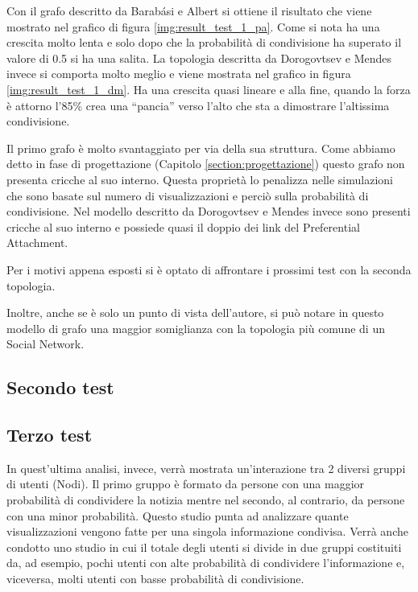 Con il grafo descritto da Barabási e Albert si ottiene il risultato che viene mostrato nel grafico di figura \ref{img:result_test_1_pa}.
Come si nota ha una crescita molto lenta e solo dopo che la probabilità di condivisione ha superato il valore di 0.5 si ha una salita.
La topologia descritta da Dorogovtsev e Mendes invece si comporta molto meglio e viene mostrata nel grafico in figura \ref{img:result_test_1_dm}.
Ha una crescita quasi lineare e alla fine, quando la forza è attorno l'85\% crea una ``pancia'' verso l'alto che sta a dimostrare l'altissima 
condivisione.

Il primo grafo è molto svantaggiato per via della sua struttura. Come abbiamo detto in fase di progettazione (Capitolo \ref{section:progettazione}) 
questo grafo non presenta cricche al suo interno.
Questa proprietà lo penalizza nelle simulazioni che sono basate sul numero di visualizzazioni e perciò sulla probabilità di condivisione.
Nel modello descritto da Dorogovtsev e Mendes invece sono presenti cricche al suo interno e possiede quasi il doppio dei link del Preferential Attachment.

Per i motivi appena esposti si è optato di affrontare i prossimi test con la seconda topologia.

Inoltre, anche se è solo un punto di vista dell'autore, si può notare in questo modello di grafo una 
maggior somiglianza con la topologia più comune di un Social Network.


\subsection{Secondo test}
\label{section:second_test}




\subsection{Terzo test}
\label{section:third_test}

In quest'ultima analisi, invece, verrà mostrata un'interazione tra 2 diversi gruppi di utenti (Nodi).
Il primo gruppo è formato da persone con una maggior probabilità di condividere la notizia 
mentre nel secondo, al contrario, da persone con una minor probabilità.
Questo studio punta ad analizzare quante visualizzazioni vengono fatte per una singola informazione condivisa.
Verrà anche condotto uno studio in cui il totale degli utenti si divide in due gruppi costituiti da, ad esempio, 
pochi utenti con alte probabilità di condividere l'informazione e, viceversa, 
molti utenti con basse probabilità di condivisione.


